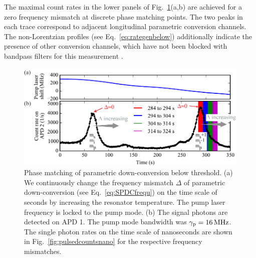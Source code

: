 \documentclass[aps,pra,showpacs,reprint,onecolumn,notitlepage]{revtex4-1}
\newcommand{\tx}[1]{\textnormal{#1}}
\begin{document}
The maximal count rates in the lower panels of Fig.~\ref{fig:pulsedcounts}(a,b) are achieved for a zero frequency mismatch at discrete phase matching points. The two peaks in each trace correspond to adjacent longitudinal parametric conversion channels. The non-Lorentzian profiles (see Eq.~\ref{eq:rategenbelow}) additionally indicate the presence of other conversion channels, which have not been blocked with bandpass filters for this measurement \cite{Michael2014}.

\begin{figure}[htb]
  \centering
  \includegraphics[scale=0.8]{pictures/exp_WGMR_detuning/SPDC_detuning_tempshift_1.pdf} 
\caption{Phase matching of parametric down-conversion below threshold. (a) We continuously change the frequency mismatch $\Delta$ of parametric down-conversion (see Eq.~\ref{eq:SPDCfrequ}) on the time scale of seconds by increasing the resonator temperature. The pump laser frequency is locked to the pump mode. (b) The signal photons are detected on APD 1. The pump mode bandwidth was $\gamma_\tx{p}=\SI{16}{\MHz}$. The single photon rates on the time scale of nanoseconds are shown in Fig.~\ref{fig:pulsedcountsnano} for the respective frequency mismatches.}
	\label{fig:pulsedcounts}
\end{figure}
\end{document}
